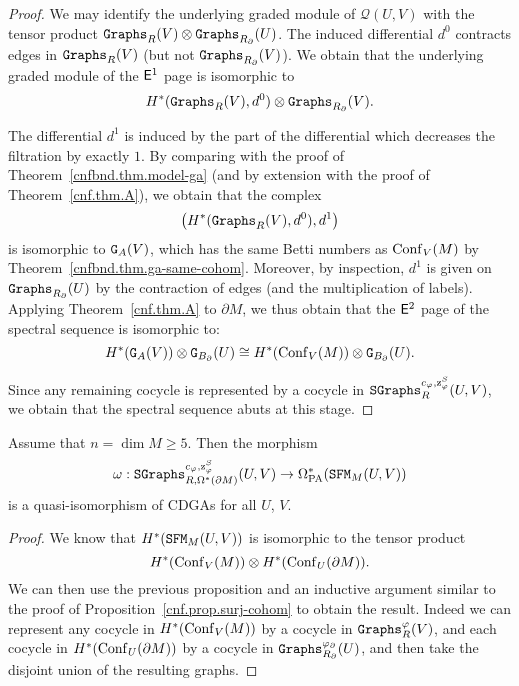 \begin{proof}
  We may identify the underlying graded module of $\mathcal{Q}(U,V)$ with the tensor product $\mathtt{Graphs}_{R}(V) \otimes \mathtt{Graphs}_{R_{\partial}}(U)$.
  The induced differential $d^{0}$ contracts edges in $\mathtt{Graphs}_{R}(V)$ (but not $\mathtt{Graphs}_{R_{\partial}}(V)$).
  We obtain that the underlying graded module of the $\mathsf{E}^{1}$ page is isomorphic to
  \[ H^{*}(\mathtt{Graphs}_{R}(V), d^{0}) \otimes \mathtt{Graphs}_{R_{\partial}}(V). \]

  The differential $d^{1}$ is induced by the part of the differential which decreases the filtration by exactly $1$.
  By comparing with the proof of Theorem~\ref{cnfbnd.thm.model-ga} (and by extension with the proof of Theorem~\ref{cnf.thm.A}), we obtain that the complex
  \[\bigl( H^{*}(\mathtt{Graphs}_{R}(V), d^{0}), d^{1} \bigr) \]
  is isomorphic to $\mathtt{G}_{A}(V)$, which has the same Betti numbers as $\operatorname{Conf}_{V}(M)$ by Theorem~\ref{cnfbnd.thm.ga-same-cohom}.
  Moreover, by inspection, $d^{1}$ is given on $\mathtt{Graphs}_{R_{\partial}}(U)$ by the contraction of edges (and the multiplication of labels).
  Applying Theorem~\ref{cnf.thm.A} to $\partial M$, we thus obtain that the $\mathsf{E}^{2}$ page of the spectral sequence is isomorphic to:
  \[ H^{*}(\mathtt{G}_{A}(V)) \otimes \mathtt{G}_{B_{\partial}}(U) \cong H^{*}(\operatorname{Conf}_{V}(M)) \otimes \mathtt{G}_{B_{\partial}}(U). \]

  Since any remaining cocycle is represented by a cocycle in $\mathtt{SGraphs}^{c_{\varphi}, \mathrm{z}^{S}_{\varphi}}_{R}(U,V)$, we obtain that the spectral sequence abuts at this stage.
\end{proof}

\begin{proposition}
  Assume that $n = \dim M \ge 5$.
  Then the morphism
  \[ \omega : \mathtt{SGraphs}^{c_{\varphi},\mathrm{z}^{S}_{\varphi}}_{R,\Omega^{*}(\partial M)}(U,V) \to \Omega_{\mathrm{PA}}^{*}(\mathtt{SFM}_{M}(U,V)) \]
  is a quasi-isomorphism of CDGAs for all $U$, $V$.
\end{proposition}
\begin{proof}
  We know that $H^{*}(\mathtt{SFM}_{M}(U,V))$ is isomorphic to the tensor product
  \[ H^{*}(\operatorname{Conf}_{V}(M)) \otimes H^{*}(\operatorname{Conf}_{U}(\partial M)). \]
  We can then use the previous proposition and an inductive argument similar to the proof of Proposition~\ref{cnf.prop.surj-cohom} to obtain the result.
  Indeed we can represent any cocycle in $H^{*}(\operatorname{Conf}_{V}(M))$ by a cocycle in $\mathtt{Graphs}^{\varphi}_{R}(V)$, and each cocycle in $H^{*}(\operatorname{Conf}_{U}(\partial M))$ by a cocycle in $\mathtt{Graphs}^{\varphi_{\partial}}_{R_{\partial}}(U)$, and then take the disjoint union of the resulting graphs.
\end{proof}

